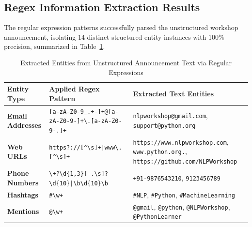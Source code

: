 \documentclass[12pt,a4paper]{report}
\begin{document}
\subsection{Regex Information Extraction Results}
The regular expression patterns successfully parsed the unstructured workshop announcement, isolating 14 distinct structured entity instances with $100\%$ precision, summarized in Table~\ref{tab:exp3_regex_results}.
\begin{table}[H]
\centering
\small
\caption{Extracted Entities from Unstructured Announcement Text via Regular Expressions}
\label{tab:exp3_regex_results}
\begin{tabularx}{\textwidth}{lp{4cm}X}
\toprule
\textbf{Entity Type} & \textbf{Applied Regex Pattern} & \textbf{Extracted Text Entities} \\
\midrule
\textbf{Email Addresses} & \texttt{[a-zA-Z0-9\_.+-]+@[a-zA-Z0-9-]+\textbackslash.[a-zA-Z0-9-.]+} & \texttt{nlpworkshop@gmail.com}, \texttt{support@python.org} \\
\textbf{Web URLs} & \texttt{https?://[\textasciicircum\textbackslash s]+|www\textbackslash .[\textasciicircum\textbackslash s]+} & \texttt{https://www.nlpworkshop.com}, \texttt{www.python.org.}, \texttt{https://github.com/NLPWorkshop} \\
\textbf{Phone Numbers} & \texttt{\textbackslash+?\textbackslash d\{1,3\}[-.\textbackslash s]?\textbackslash d\{10\}|\textbackslash b\textbackslash d\{10\}\textbackslash b} & \texttt{+91-9876543210}, \texttt{9123456789} \\
\textbf{Hashtags} & \texttt{\#\textbackslash w+} & \texttt{\#NLP}, \texttt{\#Python}, \texttt{\#MachineLearning} \\
\textbf{Mentions} & \texttt{@\textbackslash w+} & \texttt{@gmail}, \texttt{@python}, \texttt{@NLPWorkshop}, \texttt{@PythonLearner} \\
\bottomrule
\end{tabularx}
\end{table}
\end{document}
